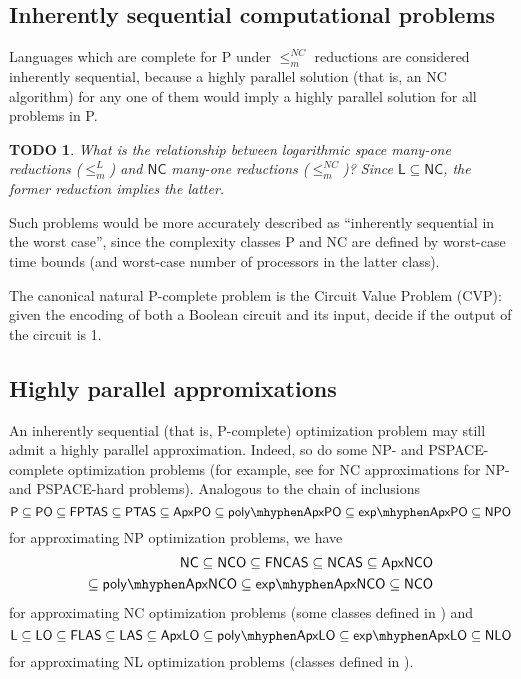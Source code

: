 \documentclass{article}
\newtheorem{todo}{TODO}
\begin{document}
\subsection{Inherently sequential computational problems}

Languages which are complete for \textsf{P} under $\leq_m^{NC}$ reductions are considered inherently sequential, because a highly parallel solution (that is, an \textsf{NC} algorithm) for any one of them would imply a highly parallel solution for all problems in \textsf{P}.
\begin{todo}
  What is the relationship between logarithmic space many-one reductions ($\leq_m^L$) and $\mathsf{NC}$ many-one reductions ($\leq_m^{NC}$)?
  Since $\mathsf{L}\subseteq\mathsf{NC}$, the former reduction implies the latter.
\end{todo}
Such problems would be more accurately described as ``inherently sequential in the worst case'', since the complexity classes \textsf{P} and \textsf{NC} are defined by worst-case time bounds (and worst-case number of processors in the latter class).

The canonical natural \textsf{P}-complete problem is the Circuit Value Problem (CVP): given the encoding of both a Boolean circuit and its input, decide if the output of the circuit is 1.

\subsection{Highly parallel appromixations}

An inherently sequential (that is, \textsf{P}-complete) optimization problem may still admit a highly parallel approximation.
Indeed, so do some \textsf{NP}- and \textsf{PSPACE}-complete optimization problems (for example, see \cite{hmrrrs98} for \textsf{NC} approximations for \textsf{NP}- and \textsf{PSPACE}-hard problems).
Analogous to the chain of inclusions
\begin{displaymath}
  \mathsf{P} \subseteq \mathsf{PO} \subseteq \mathsf{FPTAS} \subseteq \mathsf{PTAS} \subseteq \mathsf{ApxPO} \subseteq \mathsf{poly\mhyphen ApxPO} \subseteq \mathsf{exp\mhyphen ApxPO} \subseteq \mathsf{NPO}
\end{displaymath}
for approximating \textsf{NP} optimization problems, we have
\begin{align*}
  \mathsf{NC} \subseteq \mathsf{NCO} \subseteq \mathsf{FNCAS} \subseteq \mathsf{NCAS} \subseteq \mathsf{ApxNCO} \\
  \subseteq \mathsf{poly\mhyphen ApxNCO} \subseteq \mathsf{exp\mhyphen ApxNCO} \subseteq \mathsf{NCO}
\end{align*}
for approximating \textsf{NC} optimization problems (some classes defined in \cite{dsst97}) and
\begin{displaymath}
  \mathsf{L} \subseteq \mathsf{LO} \subseteq \mathsf{FLAS} \subseteq \mathsf{LAS} \subseteq \mathsf{ApxLO} \subseteq \mathsf{poly\mhyphen ApxLO} \subseteq \mathsf{exp\mhyphen ApxLO} \subseteq \mathsf{NLO}
\end{displaymath}
for approximating \textsf{NL} optimization problems (classes defined in \cite{tantau07}).
\end{document}
